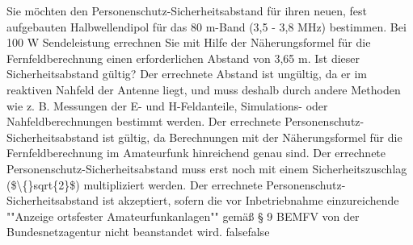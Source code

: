     {Sie möchten den Personenschutz-Sicherheitsabstand für ihren neuen, fest aufgebauten Halbwellendipol für das 80 m-Band (3,5 - 3,8 MHz) bestimmen. Bei 100 W Sendeleistung errechnen Sie mit Hilfe der Näherungsformel für die Fernfeldberechnung einen erforderlichen Abstand von 3,65 m. Ist dieser Sicherheitsabstand gültig?}
    {Der errechnete Abstand ist ungültig, da er im reaktiven Nahfeld der Antenne liegt, und muss deshalb durch andere Methoden wie z. B. Messungen der E- und H-Feldanteile, Simulations- oder Nahfeldberechnungen bestimmt werden.}
    {Der errechnete Personenschutz-Sicherheitsabstand ist gültig, da Berechnungen mit der Näherungsformel für die Fernfeldberechnung im Amateurfunk hinreichend genau sind.}
    {Der errechnete Personenschutz-Sicherheitsabstand muss erst noch mit einem Sicherheitszuschlag (\$\textbackslash\{\}sqrt\{2\}\$) multipliziert werden.}
    {Der errechnete Personenschutz-Sicherheitsabstand ist akzeptiert, sofern die vor Inbetriebnahme einzureichende ""Anzeige ortsfester Amateurfunkanlagen"" gemäß § 9 BEMFV von der Bundesnetzagentur nicht beanstandet wird.}
    {false}{false}